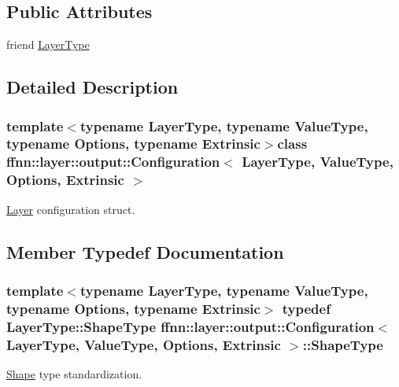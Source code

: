 \subsection*{Public Attributes}
\begin{DoxyCompactItemize}
\item 
friend \hyperlink{classffnn_1_1layer_1_1output_1_1_configuration_a91d957d5fc4cd2f9dcf348096fb013eb}{Layer\-Type}
\end{DoxyCompactItemize}


\subsection{Detailed Description}
\subsubsection*{template$<$typename Layer\-Type, typename Value\-Type, typename Options, typename Extrinsic$>$class ffnn\-::layer\-::output\-::\-Configuration$<$ Layer\-Type, Value\-Type, Options, Extrinsic $>$}

\hyperlink{classffnn_1_1layer_1_1_layer}{Layer} configuration struct. 

\subsection{Member Typedef Documentation}
\hypertarget{classffnn_1_1layer_1_1output_1_1_configuration_a94205bb6347c6cf89c33b2e4f8b467ea}{
\subsubsection[{Shape\-Type}]{\setlength{\rightskip}{0pt plus 5cm}template$<$typename Layer\-Type, typename Value\-Type, typename Options, typename Extrinsic$>$ typedef Layer\-Type\-::\-Shape\-Type {\bf ffnn\-::layer\-::output\-::\-Configuration}$<$ {\bf Layer\-Type}, Value\-Type, Options, Extrinsic $>$\-::{\bf Shape\-Type}}}\label{classffnn_1_1layer_1_1output_1_1_configuration_a94205bb6347c6cf89c33b2e4f8b467ea}


\hyperlink{structffnn_1_1layer_1_1_shape}{Shape} type standardization. 




